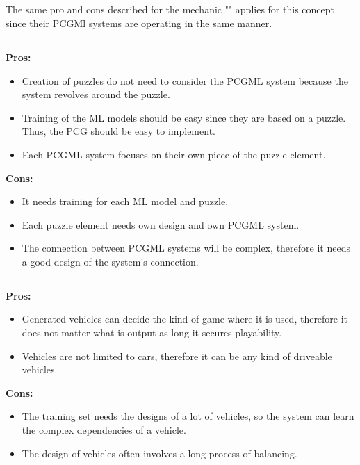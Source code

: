\documentclass[MGS,Master,english]{twbook}%
\begin{document}
\subsection{}
The same pro and cons described for the mechanic "" applies for this concept since their PCGMl systems are operating in the same manner.

\subsection{}
\textbf{Pros:}
\begin{itemize}
	\item Creation of puzzles do not need to consider the PCGML system because the system revolves around the puzzle.
	\item Training of the ML models should be easy since they are based on a puzzle. Thus, the PCG should be easy to implement.
	\item Each PCGML system focuses on their own piece of the puzzle element.
\end{itemize}
\textbf{Cons:}
\begin{itemize}
	\item It needs training for each ML model and puzzle.
	\item Each puzzle element needs own design and own PCGML system.
	\item The connection between PCGML systems will be complex, therefore it needs a good design of the system's connection.
\end{itemize}

\subsection{}
\textbf{Pros:}
\begin{itemize}
	\item Generated vehicles can decide the kind of game where it is used, therefore it does not matter what is output as long it secures playability.
	\item Vehicles are not limited to cars, therefore it can be any kind of driveable vehicles.
\end{itemize}
\textbf{Cons:}
\begin{itemize}
	\item The training set needs the designs of a lot of vehicles, so the system can learn the complex dependencies of a vehicle.
	\item The design of vehicles often involves a long process of balancing.
\end{itemize}
\end{document}
